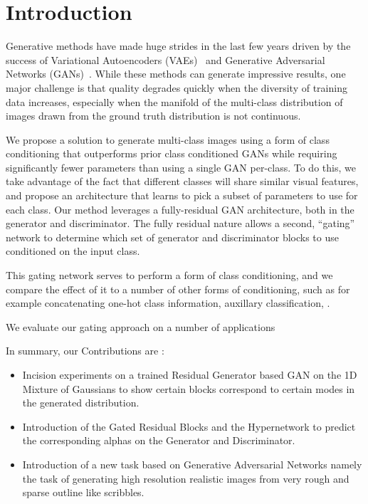 \section{Introduction}
Generative methods have made huge strides in the last few years driven by the success of Variational Autoencoders (VAEs)~\cite{kingma2013auto} and Generative Adversarial Networks (GANs)~\cite{goodfellow2014generative}. 
While these methods can generate impressive results, one major challenge is that quality degrades quickly when the diversity of training data increases, especially when the manifold of the multi-class distribution of images drawn from the ground truth distribution is not continuous. 

We propose a solution to generate multi-class images using a form of class conditioning that outperforms prior class conditioned GANs while requiring significantly fewer parameters than using a single GAN per-class. 
To do this, we take advantage of the fact that different classes will share similar visual features, and propose an architecture that learns to pick a subset of parameters to use for each class.
Our method leverages a fully-residual GAN architecture, both in the generator and discriminator. 
The fully residual nature allows a second, ``gating'' network to determine which set of generator and discriminator blocks to use conditioned on the input class. 

This gating network serves to perform a form of class conditioning, and we compare the effect of it to a number of other forms of conditioning, such as for example concatenating one-hot class information, auxillary classification, .

We evaluate our gating approach on a number of applications 

In summary, our Contributions are :
\begin{itemize}
\item Incision experiments on a trained Residual Generator based GAN on the 1D Mixture of Gaussians to show certain blocks correspond to certain modes in the generated distribution.
\item Introduction of the Gated Residual Blocks and the Hypernetwork to predict the corresponding alphas on the Generator and Discriminator.
\item Introduction of a new task based on Generative Adversarial Networks namely the task of generating high resolution realistic images from very rough and sparse outline like scribbles.
\end{itemize}